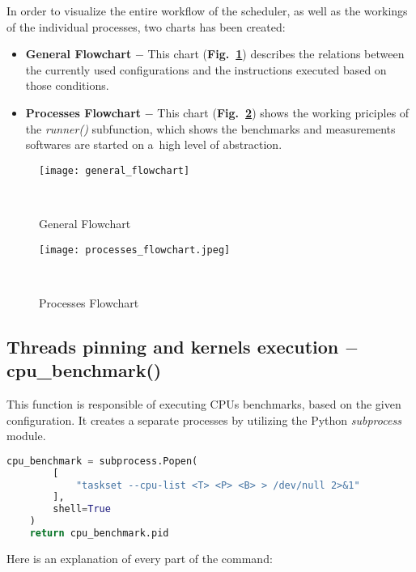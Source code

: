 In order to visualize the entire workflow of the scheduler, as well as the 
workings of the individual processes, two charts has been created:
\begin{itemize}
    \item \textbf{General Flowchart} $-$ This chart
    (\textbf{Fig.~\ref{fig:general_flowchart}}) describes the relations
    between the currently used configurations and the instructions executed
    based on those conditions.
    \item \textbf{Processes Flowchart} $-$ This chart
    (\textbf{Fig.~\ref{fig:processes_flowchart}}) shows the working priciples of the
    \emph{runner\@()} subfunction, which shows the benchmarks and measurements
    softwares are started on a~high level of abstraction.
\end{itemize}

\newpage

\begin{figure}[hbtp!]
    \centering
    \texttt{[image: general\_flowchart]}
    \caption{General Flowchart}~\label{fig:general_flowchart}
\end{figure}

\begin{figure}[hbtp!]
    \centering
    \texttt{[image: processes\_flowchart.jpeg]}
    \caption{Processes Flowchart}~\label{fig:processes_flowchart}
\end{figure}

\newpage

\subsection{Threads pinning and kernels execution $-$ cpu\_benchmark()}

This function is responsible of executing CPUs benchmarks, based on the
given configuration. It creates a separate processes by utilizing the
Python \emph{subprocess} module. 

\begin{lstlisting}[language=Python]
    cpu_benchmark = subprocess.Popen(
        [
            "taskset --cpu-list <T> <P> <B> > /dev/null 2>&1"
        ],
        shell=True
    )
    return cpu_benchmark.pid
\end{lstlisting}

Here is an explanation of every part of the command:

